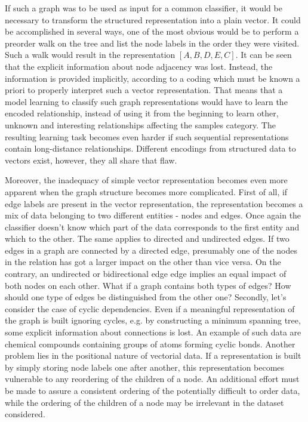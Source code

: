  If such a graph was to be used as input for a common classifier, it would be necessary to transform the structured representation into a plain vector. It could be accomplished in several ways, one of the most obvious would be to perform a preorder walk on the tree and list the node labels in the order they were visited. Such a walk would result in the representation $[A,B,D,E,C]$. It can be seen that the explicit information about node adjacency was lost. Instead, the information is provided implicitly, according to a coding which must be known a priori to properly interpret such a vector representation. That means that a model learning to classify such graph representations would have to learn the encoded relationship, instead of using it from the beginning to learn other, unknown and interesting relationships affecting the samples category. The resulting learning task becomes even harder if such sequential representations contain long-distance relationships. Different encodings from structured data to vectors exist, however, they all share that flaw.

Moreover, the inadequacy of simple vector representation becomes even more apparent when the graph structure becomes more complicated. First of all, if edge labels are present in the vector representation, the representation becomes a mix of data belonging to two different entities - nodes and edges. Once again the classifier doesn't know which part of the data corresponds to the first entity and which to the other. The same applies to directed and undirected edges. If two edges in a graph are connected by a directed edge, presumably one of the nodes in the relation has got a larger impact on the other than vice versa. On the contrary, an undirected or bidirectional edge edge implies an equal impact of both nodes on each other. What if a graph contains both types of edges? How should one type of edges be distinguished from the other one? Secondly, let's consider the case of cyclic dependencies. Even if a meaningful representation of the graph is built ignoring cycles, e.g. by constructing a minimum spanning tree, some explicit information about connections is lost. An example of such data are chemical compounds containing groups of atoms forming cyclic bonds. Another problem lies in the positional nature of vectorial data. If a representation is built by simply storing node labels one after another, this representation becomes vulnerable to any reordering of the children of a node. An additional effort must be made to assure a consistent ordering of the potentially difficult to order data, while the ordering of the children of a node may be irrelevant in the dataset considered.

